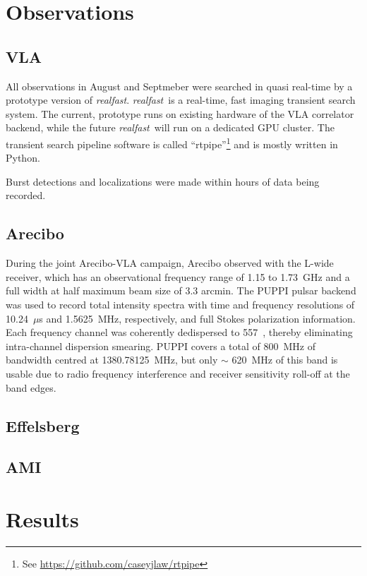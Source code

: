 \documentclass{emulateapj}
\newcommand{\rf}{\emph{realfast}}
\begin{document}
\section{Observations}
\subsection{VLA}

All observations in August and Septmeber were searched in quasi real-time by a prototype version of \rf. \rf\ is a real-time, fast imaging transient search system. The current, prototype runs on existing hardware of the VLA correlator backend, while the future \rf\ will run on a dedicated GPU cluster. The transient search pipeline software is called ``rtpipe''\footnote{See \url{https://github.com/caseyjlaw/rtpipe}} and is mostly written in Python.

Burst detections and localizations were made within hours of data being recorded.

\subsection{Arecibo}

During the joint Arecibo-VLA campaign, Arecibo observed with the L-wide receiver, which has an observational frequency range of 1.15 to 1.73~GHz and a full width at half maximum beam size of 3.3 arcmin. The PUPPI pulsar backend was used to record total intensity spectra with time and frequency resolutions of 10.24~$\mu$s and 1.5625~MHz, respectively, and full Stokes polarization information. Each frequency channel was coherently dedispersed to 557~\dmu, thereby eliminating intra-channel dispersion smearing. PUPPI covers a total of 800~MHz of bandwidth centred at 1380.78125~MHz, but only $\sim$ 620~MHz of this band is usable due to radio frequency interference and receiver sensitivity roll-off at the band edges.

\subsection{Effelsberg}



\subsection{AMI}



\section{Results}
\end{document}
